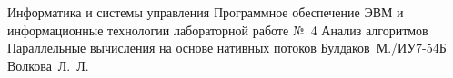 \documentclass{bmstu}[a4paper]
\begin{document}
\makereporttitle
{Информатика и системы управления} %
{Программное обеспечение ЭВМ и информационные технологии} %
{лабораторной работе №~4} %
{Анализ алгоритмов} %
{Параллельные вычисления на основе нативных потоков} %
{} %
{Булдаков~М./ИУ7-54Б} %
{Волкова~Л.~Л.} %

\maketableofcontents




% 
% 
% 


\makebibliography

%
\end{document}
